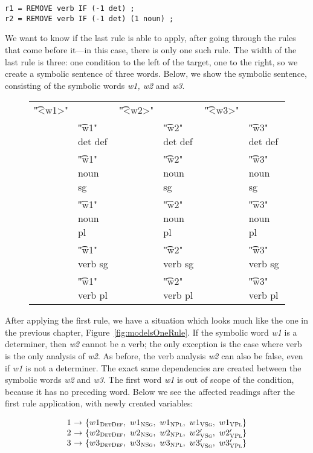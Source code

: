 \begin{verbatim}
r1 = REMOVE verb IF (-1 det) ;
r2 = REMOVE verb IF (-1 det) (1 noun) ;
\end{verbatim}


We want to know if the last rule is able to apply, after going through the rules that come before it---in this case, there is only one such rule.
The width of the last rule is three: one condition to the left of the target, one to the right, so we create a symbolic sentence of three words. Below, we show the symbolic sentence, consisting of the symbolic words {\em w1, w2} and {\em w3}.

\begin{figure}[h]
\centering
\begin{tabular}{p{0.6cm} l  p{0.6cm} l p{0.6cm} l }
\t{"<w1>"}    &                     &  \t{"<w2>"}  &           &  \t{"<w3>"}    \\
              & \t{"w1" det def}    & &      \t{"w2" det def}  & &  \t{"w3" det def} \\
              & \t{"w1" noun sg}    & &      \t{"w2" noun sg}  & &  \t{"w3" noun sg} \\
              & \t{"w1" noun pl}    & &      \t{"w2" noun pl}  & &  \t{"w3" noun pl} \\
              & \t{"w1" verb sg}    & &      \t{"w2" verb sg}  & &  \t{"w3" verb sg} \\
              & \t{"w1" verb pl}    & &      \t{"w2" verb pl}  & &  \t{"w3" verb pl} \\
\end{tabular}
\end{figure}

After applying the first rule, we have a situation which looks much like the one in the previous chapter, Figure~\ref{fig:modelsOneRule}.
If the symbolic word {\em w1} is a determiner, then {\em w2} cannot be a verb;
the only exception is the case where verb is the only analysis of {\em w2}.
As before, the verb analysis {\em w2} can also be false, even if {\em w1}
is not a determiner. The exact same dependencies are created between the
symbolic words {\em w2} and {\em w3}.
The first word {\em w1} is out of scope of the condition, because it has no preceding word.
Below we see the affected readings after the first rule application, with newly created variables:

\begin{figure}[h]
$$\begin{array}{l @{~\rightarrow~} l}
1 & \{w1_{\detdef}, \  w1_{\noun\sg}, \  w1_{\noun\pl}, \ w1_{\verb\sg}, \ w1_{\verb\pl} \} \\
2 & \{w2_{\detdef}, \  w2_{\noun\sg}, \  w2_{\noun\pl}, \ w2'_{\verb\sg}, \ w2'_{\verb\pl} \} \\
3 & \{w3_{\detdef}, \  w3_{\noun\sg}, \  w3_{\noun\pl}, \ w3'_{\verb\sg}, \ w3'_{\verb\pl} \} \\
\end{array}$$
\end{figure}

